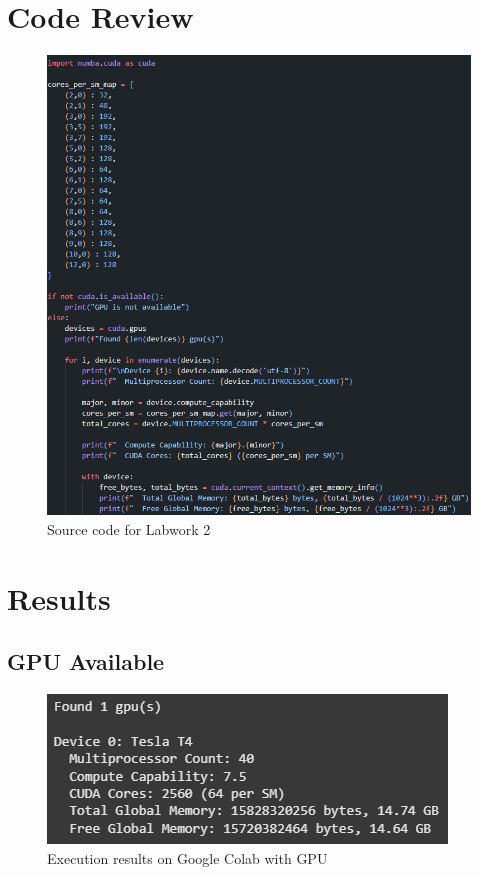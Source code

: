 \documentclass[12pt]{article}
\begin{document}
\section{Code Review}
\begin{figure}[H]
    \centering
    \includegraphics[width=\linewidth]{images/code.png}
    \caption{Source code for Labwork 2}
    \label{fig:code}
\end{figure}

\section{Results}
\subsection{GPU Available}
\begin{figure}[H]
    \centering
    \includegraphics[width=0.75\linewidth]{images/output.png}
    \caption{Execution results on Google Colab with GPU}
    \label{fig:gpu}
\end{figure}
\end{document}
